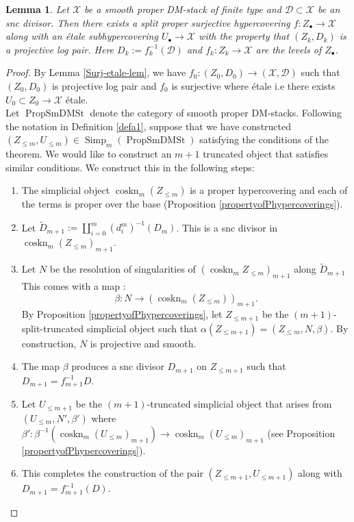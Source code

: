 \documentclass[a4paper]{amsart}
\newtheorem{lemma}[theorem]{Lemma}
\theoremstyle{definition}
\begin{document}
\begin{lemma}\label{Hypercover-lem}
    Let $\mathscr{X}$ be a smooth proper DM-stack of finite type and $\mathscr{D} \subset \mathscr{X}$ be an snc divisor. Then there exists a split proper surjective hypercovering $f:Z_{\bullet} \to \mathscr{X}$ along with an \'etale subhypercovering $U_{\bullet} \to \mathscr{X}$ with the property that $(Z_k,D_k)$ is a projective log pair. Here $D_k:=f_k^{-1}(\mathscr{D})$ and $f_k: Z_k \to \mathscr{X}$ are the levels of $Z_\bullet$.
\end{lemma}
\begin{proof}
By Lemma \ref{Surj-etale-lem}, we have $f_0:(Z_0,D_0) \to (\mathscr{X},\mathscr{D})$ such that $(Z_0,D_0)$ is projective log pair and $f_0$ is surjective where \'etale i.e there exists $U_0 \subset Z_0 \to \mathscr{X}$ \'etale. \\
Let $\operatorname{PropSmDMSt}$ denote the category of smooth proper DM-stacks. Following the notation in Definition \ref{defa1}, suppose that we have constructed $(Z_{\le m}, U_{\le m}) \in \operatorname{Simp}_m(\operatorname{PropSmDMSt})$ satisfying the conditions of the theorem. We would like to construct an $m+1$ truncated object that satisfies similar conditions. We construct this in the following steps: 
\begin{enumerate}
    \item The simplicial object $\operatorname{coskn}_m (Z_{\le m})$ is a proper hypercovering and each of the terms is proper over the base (Proposition \ref{propertyofPhypercoverings}).
    \item Let $\widetilde{D}_{m+1} := \coprod_{i=0}^m (d^m_i)^{-1}(D_m)$. This is a snc divisor in $ \operatorname{coskn}_m(Z_{\le m})_{m+1}$.
    \item Let $N$ be the resolution of singularities of $(\operatorname{coskn}_m Z_{\le m})_{m+1}$ along $\widetilde{D}_{m+1}$  This comes with a map :
    \begin{equation*}
        \beta : N \to (\operatorname{coskn}_m (Z_{\le m}))_{m+1}.
    \end{equation*}
    By Proposition \ref{propertyofPhypercoverings}, let $Z_{\le m+1}$ be the $(m+1)$-split-truncated simplicial object such that $\alpha(Z_{\le m+1})= (Z_{\le m},N,\beta)$. By construction, $N$ is projective and smooth. 
    \item The map $\beta$ produces a snc divisor $D_{m+1}$ on $Z_{\le m+1}$ such that $D_{m+1}=f_{m+1}^{-1}D$.
    \item Let $U_{\le m+1}$ be the $(m+1)$-truncated simplicial object that arises from $(U_{\le m},N',\beta')$ where $\beta': \beta^{-1}(\operatorname{coskn}_m(U_{\le m})_{m+1}) \to  \operatorname{coskn}_m(U_{\le m})_{m+1}$ (see Proposition \ref{propertyofPhypercoverings}). 
    \item This completes the construction of the pair $(Z_{\le m+1},U_{\le m+1})$ along with $D_{m+1}=f_{m+1}^{-1}(D)$.
\end{enumerate}
\end{proof}
\end{document}
